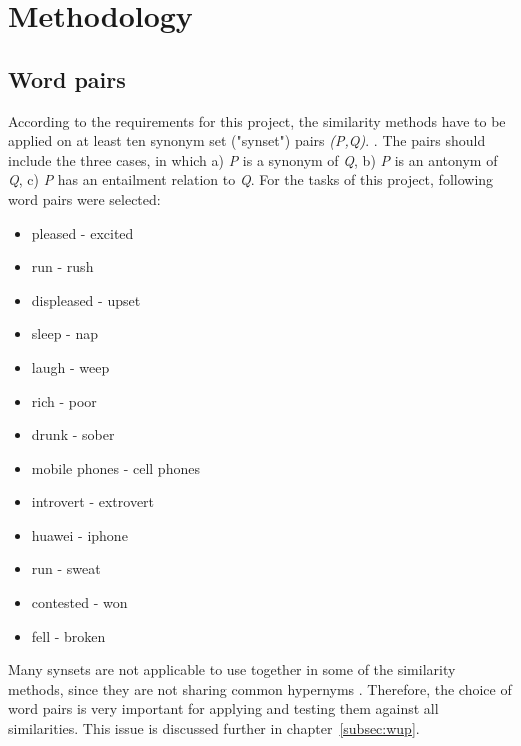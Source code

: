 \documentclass[conference]{IEEEtran}
\begin{document}
\section{Methodology}\label{sec:methodology}

\subsection{Word pairs}
According to the requirements for this project, the similarity methods have to be applied on at least ten synonym set ("synset") pairs \textit{(P,Q)}. . The pairs should include the three cases, in which a) \textit{P} is a synonym of \textit{Q}, b) \textit{P} is an antonym of \textit{Q}, c) \textit{P} has an entailment relation to \textit{Q}. For the tasks of this project, following word pairs were selected:
\begin{itemize}
\item pleased - excited
\item run - rush
\item displeased - upset
\item sleep - nap
\item laugh - weep
\item rich - poor
\item drunk - sober
\item mobile phones - cell phones
\item introvert - extrovert
\item huawei - iphone
\item run - sweat
\item contested - won
\item fell - broken
\end{itemize}
Many synsets are not applicable to use together in some of the similarity methods, since they are not sharing common hypernyms \cite{perkins}. Therefore, the choice of word pairs is very important for applying and testing them against all similarities. This issue is discussed further in chapter~\ref{subsec:wup}.
\end{document}

